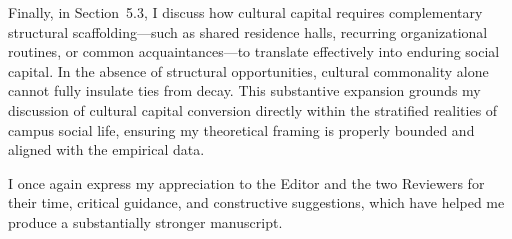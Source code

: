 \documentclass[11pt]{article}
\begin{document}
Finally, in Section~5.3, I discuss how cultural capital requires complementary structural scaffolding—such as shared residence halls, recurring organizational routines, or common acquaintances—to translate effectively into enduring social capital. In the absence of structural opportunities, cultural commonality alone cannot fully insulate ties from decay. This substantive expansion grounds my discussion of cultural capital conversion directly within the stratified realities of campus social life, ensuring my theoretical framing is properly bounded and aligned with the empirical data.

\vspace{12pt}
\noindent I once again express my appreciation to the Editor and the two Reviewers for their time, critical guidance, and constructive suggestions, which have helped me produce a substantially stronger manuscript.
\end{document}
